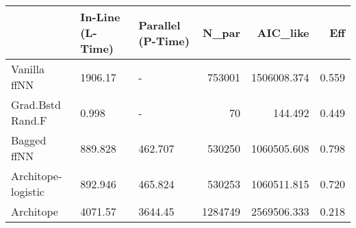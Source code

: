 \begin{tabular}{lllrrr}
\toprule
{} & In-Line (L-Time) & Parallel (P-Time) &    N\_par &     AIC\_like &    Eff \\
\midrule
Vanilla ffNN       &          1906.17 &                 - &   753001 &  1506008.374 &  0.559 \\
Grad.Bstd Rand.F   &            0.998 &                 - &       70 &      144.492 &  0.449 \\
Bagged ffNN        &          889.828 &           462.707 &   530250 &  1060505.608 &  0.798 \\
Architope-logistic &          892.946 &           465.824 &   530253 &  1060511.815 &  0.720 \\
Architope          &          4071.57 &           3644.45 &  1284749 &  2569506.333 &  0.218 \\
\bottomrule
\end{tabular}
